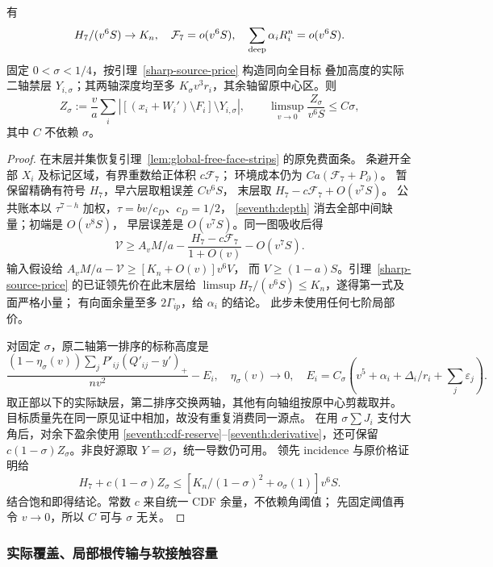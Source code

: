 \begin{lemma}[领先饱和与剩余缺量]\label{seventh:saturation}
有
\begin{equation}\label{seventh:face-small}
 H_7/(v^6S)\to K_n,\quad \mathcal F_7=o(v^6S),\quad
 \sum_{\rm deep}\alpha_iR_i^n=o(v^6S).
\end{equation}
固定 \(0<\sigma<1/4\)，按引理~\ref{sharp-source-price} 构造同向全目标
叠加高度的实际二轴禁层 \(Y_{i,\sigma}\)；其两轴深度均至多
\(K_\sigma v^3r_i\)，其余轴留原中心区。则
\begin{equation}\label{seventh:residual}
 Z_\sigma:=\frac va\sum_i
 |[(x_i+W_i')\setminus F_i]\setminus Y_{i,\sigma}|,
 \qquad \limsup_{v\to0}\frac{Z_\sigma}{v^6S}\le C\sigma,
\end{equation}
其中 \(C\) 不依赖 \(\sigma\)。
\end{lemma}
\begin{proof}
在末层并集恢复引理~\ref{lem:global-free-face-strips} 的原免费面条。
条避开全部 \(X_i\) 及标记区域，有界重数给正体积 \(c\mathcal F_7\)；
环境成本仍为 \(Ca(\mathcal F_7+P_\partial)\)。
暂保留精确有符号 \(H_7\)，早六层取粗误差 \(Cv^6S\)，
末层取 \(H_7-c\mathcal F_7+O(v^7S)\)。
公共账本以 \(\tau^{7-h}\) 加权，\(\tau=bv/c_D\)、\(c_D=1/2\)，
\eqref{seventh:depth} 消去全部中间缺量；初端是 \(O(v^8S)\)，
早层误差是 \(O(v^7S)\)。同一图吸收后得
\[
 \mathcal V\ge A_vM/a-
 \frac{H_7-c\mathcal F_7}{1+O(v)}-O(v^7S).
\]
输入假设给 \(A_vM/a-\mathcal V\ge[K_n+O(v)]v^6V\)，
而 \(V\ge(1-a)S\)。引理~\ref{sharp-source-price} 的已证领先价在此末层给
\(\limsup H_7/(v^6S)\le K_n\)，遂得第一式及面严格小量；
有向面余量至多 \(2\Gamma_{ip}\)，给 \(\alpha_i\) 的结论。
此步未使用任何七阶局部价。

对固定 \(\sigma\)，原二轴第一排序的标称高度是
\[
 \frac{(1-\eta_\sigma(v))\sum_jP'_{ij}(Q'_{ij}-y')_+}{nv^2}-E_i,
 \quad \eta_\sigma(v)\to0,\quad
 E_i=C_\sigma\left(v^5+\alpha_i+\Delta_i/r_i+\sum_j\varepsilon_j\right).
\]
取正部以下的实际缺层，第二排序交换两轴，其他有向轴组按原中心剪裁取并。
目标质量先在同一原见证中相加，故没有重复消费同一源点。
在用 \(\sigma\sum J_i\) 支付大角后，对余下盈余使用
\eqref{seventh:cdf-reserve}--\eqref{seventh:derivative}，还可保留
\(c(1-\sigma)Z_\sigma\)。非良好源取 \(Y=\varnothing\)，统一导数仍可用。
领先 incidence 与原价格证明给
\[
 H_7+c(1-\sigma)Z_\sigma
 \le[K_n/(1-\sigma)^2+o_\sigma(1)]v^6S.
\]
结合饱和即得结论。常数 \(c\) 来自统一 CDF 余量，不依赖角阈值；
先固定阈值再令 \(v\to0\)，所以 \(C\) 可与 \(\sigma\) 无关。
\end{proof}

\subsubsection{实际覆盖、局部根传输与软接触容量}

